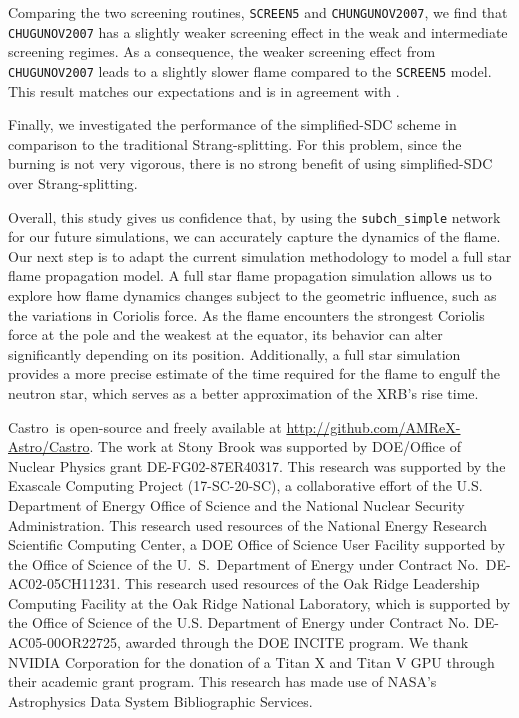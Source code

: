 \documentclass[preprint,times,tighten,linenumbers]{aastex631}
\newcommand{\castro}{{\sf Castro}}
\begin{document}
Comparing the two screening routines, {\tt SCREEN5} and {\tt CHUNGUNOV2007}, we find that {\tt CHUGUNOV2007} has a slightly weaker screening effect in the weak and intermediate screening regimes. As a consequence, the weaker screening effect from {\tt CHUGUNOV2007} leads to a slightly slower flame compared to the {\tt SCREEN5} model. This result matches our expectations and is in agreement with \cite{Chugunov_2007}.

Finally, we investigated the performance of the simplified-SDC scheme in comparison to the traditional Strang-splitting.  For this problem, since the burning is not very vigorous, there is no strong benefit of using simplified-SDC over Strang-splitting.


Overall, this study gives us confidence that, by using the {\tt subch\_simple} network for our future simulations, we can accurately capture the dynamics of the flame. Our next step is to adapt the current simulation methodology to model a full star flame propagation model. A full star flame propagation simulation allows us to explore how flame dynamics changes subject to the geometric influence, such as the variations in Coriolis force. As the flame encounters the strongest Coriolis force at the pole and the weakest at the equator, its behavior can alter significantly depending on its position. Additionally, a full star simulation provides a more precise estimate of the time required for the flame to engulf the neutron star, which serves as a better approximation of the XRB's rise time.






\begin{acknowledgements}
\castro\ is open-source and freely available at
\url{http://github.com/AMReX-Astro/Castro}.  The work at Stony Brook was supported by DOE/Office
of Nuclear Physics grant DE-FG02-87ER40317. This research was supported by the Exascale Computing 
Project (17-SC-20-SC), a collaborative effort of the U.S. Department of Energy
Office of Science and the National Nuclear Security Administration. This research used
resources of the National Energy Research Scientific Computing Center,
a DOE Office of Science User Facility supported by the Office of
Science of the U.~S.\ Department of Energy under Contract
No.\ DE-AC02-05CH11231.  This research used resources of the Oak Ridge
Leadership Computing Facility at the Oak Ridge National Laboratory,
which is supported by the Office of Science of the U.S. Department of
Energy under Contract No. DE-AC05-00OR22725, awarded through the DOE
INCITE program.  We thank NVIDIA Corporation for the donation of a
Titan X and Titan V GPU through their academic grant program.  This
research has made use of NASA's Astrophysics Data System Bibliographic
Services.
\end{acknowledgements}
\end{document}
